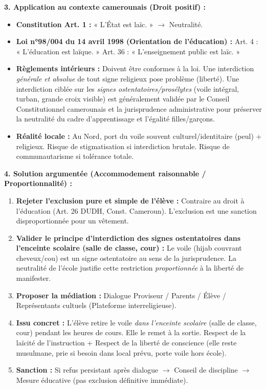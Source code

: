 \documentclass[11pt]{article}
\begin{document}
\begin{exoresolu}
\textbf{3. Application au contexte camerounais (Droit positif) :}
\begin{itemize}
    \item \textbf{Constitution Art. 1 :} « L'État est laïc. » $\rightarrow$ Neutralité.
    \item \textbf{Loi n°98/004 du 14 avril 1998 (Orientation de l'éducation) :} Art. 4 : « L'éducation est laïque. » Art. 36 : « L'enseignement public est laïc. »
    \item \textbf{Règlements intérieurs :} Doivent être conformes à la loi. Une interdiction \emph{générale et absolue} de tout signe religieux pose problème (liberté). Une interdiction ciblée sur les \emph{signes ostentatoires/prosélytes} (voile intégral, turban, grande croix visible) est généralement validée par le Conseil Constitutionnel camerounais et la jurisprudence administrative pour préserver la neutralité du cadre d'apprentissage et l'égalité filles/garçons.
    \item \textbf{Réalité locale :} Au Nord, port du voile souvent culturel/identitaire (peul) + religieux. Risque de stigmatisation si interdiction brutale. Risque de communautarisme si tolérance totale.
\end{itemize}

\textbf{4. Solution argumentée (Accommodement raisonnable / Proportionnalité) :}
\begin{enumerate}
    \item \textbf{Rejeter l'exclusion pure et simple de l'élève :} Contraire au droit à l'éducation (Art. 26 DUDH, Const. Cameroun). L'exclusion est une sanction disproportionnée pour un vêtement.
    \item \textbf{Valider le principe d'interdiction des signes ostentatoires dans l'enceinte scolaire (salle de classe, cour) :} Le voile (hijab couvrant cheveux/cou) est un signe ostentatoire au sens de la jurisprudence. La neutralité de l'école justifie cette restriction \emph{proportionnée} à la liberté de manifester.
    \item \textbf{Proposer la médiation :} Dialogue Proviseur / Parents / Élève / Représentants cultuels (Plateforme interreligieuse).
    \item \textbf{Issu concret :} L'élève retire le voile \emph{dans l'enceinte scolaire} (salle de classe, cour) pendant les heures de cours. Elle le remet à la sortie. Respect de la laïcité de l'instruction + Respect de la liberté de conscience (elle reste musulmane, prie si besoin dans local prévu, porte voile hors école).
    \item \textbf{Sanction :} Si refus persistant après dialogue $\rightarrow$ Conseil de discipline $\rightarrow$ Mesure éducative (pas exclusion définitive immédiate).
\end{enumerate}


\end{exoresolu}
\end{document}
